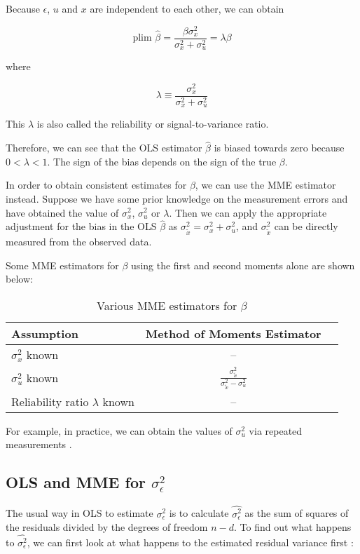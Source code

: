 \documentclass{article}
\begin{document}
Because $\epsilon$, $u$ and $x$ are independent to each other, we can obtain

\[
\textrm{plim } \hat{\beta} = \frac{\beta \sigma^2_x}{\sigma^2_x + \sigma^2_u} = \lambda \beta
\]

where

\[
\lambda \equiv \frac{\sigma_x^2}{\sigma_x^2 + \sigma_u^2}
\]

This $\lambda$ is also called the reliability or signal-to-variance ratio.

Therefore, we can see that the OLS estimator $\hat{\beta}$ is biased towards zero because $0 < \lambda < 1$. The sign of the bias depends on the sign of the true $\beta$.

In order to obtain consistent estimates for $\beta$, we can use the MME estimator instead.
Suppose we have some prior knowledge on the measurement errors and have obtained the value of $\sigma_x^2$, $\sigma_u^2$ or $\lambda$.
Then we can apply the appropriate adjustment for the bias in the OLS $\hat{\beta}$ as $\sigma^2_{\tilde{x}} = \sigma^2_x + \sigma^2_u$, and $\sigma^2_{\tilde{x}}$ can be directly measured from the observed data. 

Some MME estimators for $\beta$ using the first and second moments alone are shown below:

\begin{table}[ht]
    \centering
    \caption{Various MME estimators for $\beta$}
    \begin{tabular}[t]{lcc}
        \hline
        Assumption&Method of Moments Estimator\\
        \hline
        $\sigma_x^2$ known&--\\
        $\sigma_u^2$ known&$\frac{\sigma^2_{\tilde{x}}}{\sigma^2_{\tilde{x}} - \sigma^2_u}$\\
        Reliability ratio $\lambda$ known&--\\
        \hline
    \end{tabular}
\end{table}%

For example, in practice, we can obtain the values of $\sigma_u^2$ via repeated measurements \cite{mmereport}.

\subsection{OLS and MME for $\sigma_\epsilon^2$}

The usual way in OLS to estimate $\sigma_\epsilon^2$ is to calculate $\hat{\sigma^2_\epsilon}$ as the sum of squares of the residuals divided by the degrees of freedom $n-d$. To find out what happens to $\hat{\sigma^2_\epsilon}$, we can first look at what happens to the estimated residual variance first \cite{lecturenotes}:
\end{document}
